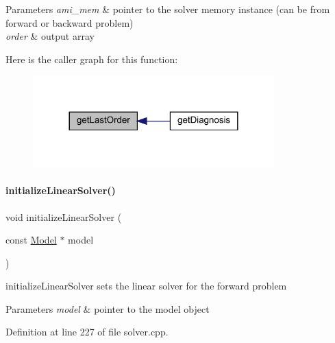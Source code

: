 \begin{DoxyParams}{Parameters}
{\em ami\+\_\+mem} & pointer to the solver memory instance (can be from forward or backward problem) \\
\hline
{\em order} & output array \\
\hline
\end{DoxyParams}
Here is the caller graph for this function\+:
\nopagebreak
\begin{figure}[H]
\begin{center}
\leavevmode
\includegraphics[width=264pt]{classamici_1_1_solver_a491a5e0ffd6c1678a8bb5313df88ab45_icgraph}
\end{center}
\end{figure}
\mbox{\label{classamici_1_1_solver_a6f41389f3a02d0b1ed9bfebcc080d3e1}} 
\paragraph{\texorpdfstring{initialize\+Linear\+Solver()}{initializeLinearSolver()}}
{\footnotesize\ttfamily void initialize\+Linear\+Solver (\begin{DoxyParamCaption}\item[{const \mbox{\hyperlink{classamici_1_1_model}{Model}} $\ast$}]{model }\end{DoxyParamCaption})\hspace{0.3cm}{\ttfamily [protected]}}

initialize\+Linear\+Solver sets the linear solver for the forward problem


\begin{DoxyParams}{Parameters}
{\em model} & pointer to the model object \\
\hline
\end{DoxyParams}


Definition at line 227 of file solver.\+cpp.

